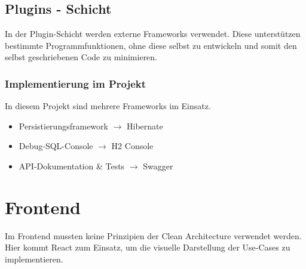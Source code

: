     	\subsection{Plugins - Schicht}
    	In der Plugin-Schicht werden externe Frameworks verwendet. Diese unterstützen bestimmte Programmfunktionen, ohne diese selbst zu entwickeln und somit den selbst geschriebenen Code zu minimieren.
    	    \subsubsection{Implementierung im Projekt}
    	    In diesem Projekt sind mehrere Frameworks im Einsatz. \\
    	    \begin{itemize}
    	        \item Persistierungsframework $\rightarrow$ Hibernate
    	        \item Debug-SQL-Console $\rightarrow$ H2 Console
    	        \item API-Dokumentation \& Tests $\rightarrow$ Swagger
    	    \end{itemize}

    \section{Frontend}
    Im Frontend mussten keine Prinzipien der Clean Architecture verwendet werden. Hier kommt React zum Einsatz, um die visuelle Darstellung der Use-Cases zu implementieren.
